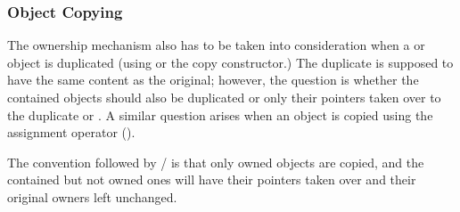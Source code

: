\subsubsection{Object Copying}

The ownership mechanism also has to be taken into consideration
when a  or  object is duplicated
(using  or the copy constructor.)
The duplicate is supposed to have the same content as the
original; however, the question is whether the contained objects
should also be duplicated or only their pointers taken over
to the duplicate  or . A similar
question arises when an object is copied using the assignment operator
().

The convention followed by / is that
only owned objects are copied, and the contained but not owned ones
will have their pointers taken over and their original owners
left unchanged.


%
%
%
%
%
%
%


